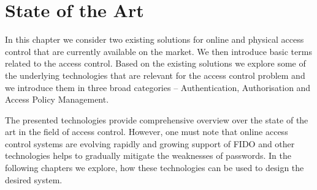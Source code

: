 \section{State of the Art} \label{sec:sota}

In this chapter we consider two existing solutions for online and physical access control that are currently available on the market. We then introduce basic terms related to the access control. Based on the existing solutions we explore some of the underlying technologies that are relevant for the access control problem and we introduce them in three broad categories -- Authentication, Authorisation and Access Policy Management.







\bigskip\noindent
The presented technologies provide comprehensive overview over the state of the art in the field of access control. However, one must note that online access control systems are evolving rapidly and growing support of FIDO and other technologies helps to gradually mitigate the weaknesses of passwords. In the following chapters we explore, how these technologies can be used to design the desired system.